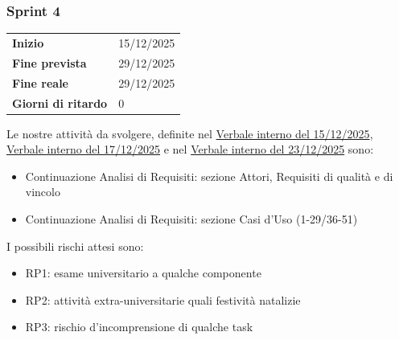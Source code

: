 \subsubsection{Sprint 4}


\begin{tabular}{p{} p{}}
	\textbf{Inizio} & 15/12/2025 \\
	\textbf{Fine prevista} & 29/12/2025 \\
	\textbf{Fine reale} & 29/12/2025\\
	\textbf{Giorni di ritardo} & 0\\
\end{tabular}
\newline \newline 
Le nostre attività da svolgere, definite nel \href{https://nullpointersgroup.github.io/Documentazione/output/RTB/Verbali%20Interni/2025-12-15_verbale_interno.pdf}{Verbale interno del 15/12/2025}, \href{https://nullpointersgroup.github.io/Documentazione/output/RTB/Verbali%20Interni/2025-12-17_verbale_interno.pdf}{Verbale interno del 17/12/2025} e nel \href{https://nullpointersgroup.github.io/Documentazione/output/RTB/Verbali%20Interni/2025-12-23_verbale_interno.pdf}{Verbale interno del 23/12/2025} sono:
\begin{itemize}[itemsep=5pt, parsep=1pt, label=$\scriptstyle\bullet$]
	\item Continuazione Analisi di Requisiti: sezione Attori, Requisiti di qualità e di vincolo
	\item Continuazione Analisi di Requisiti: sezione Casi d’Uso (1-29/36-51)
\end{itemize}


I possibili rischi attesi sono:
\begin{itemize}[itemsep=5pt, parsep=1pt, label=$\scriptstyle\bullet$]
	\item RP1: esame universitario a qualche componente
	\item RP2: attività extra-universitarie quali festività natalizie
	\item RP3: rischio d'incomprensione di qualche task
\end{itemize}


